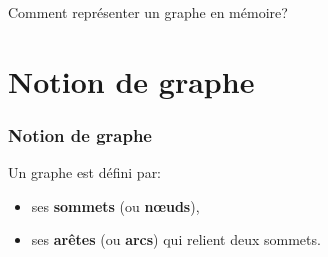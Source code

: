 \documentclass[svgnames,11pt]{beamer}
\begin{document}
\begin{frame}
\begin{center}
\begin{tikzpicture}
        \end{tikzpicture}
    \end{center}

\end{frame}
\begin{frame}
    \frametitle{}

    \begin{framed}
        \centering Comment représenter un graphe en mémoire?
    \end{framed}

\end{frame}
\section{Notion de graphe}
\begin{frame}
    \frametitle{Notion de graphe}

    Un graphe est défini par:
    \begin{itemize}
        \item ses \textbf{sommets} (ou \textbf{nœuds}),
        \item ses \textbf{arêtes} (ou \textbf{arcs}) qui relient deux sommets.
    \end{itemize}

\end{frame}
\end{document}
